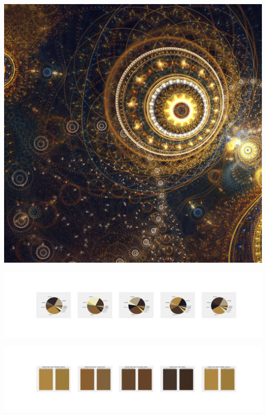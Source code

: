 \documentclass[11pt]{article}
\begin{document}
\begin{landscape}
    \begin{center}
    \includegraphics[width=\textwidth]{./nbimg/file (207).jpg}
    \end{center}

    \begin{center}
    \includegraphics[width=250mm]{./nbimg/pie-120.jpg}
    \end{center}

    \begin{center}
    \includegraphics[width=250mm]{./nbimg/peak-120.jpg}
    \end{center}
    


\end{landscape}
\end{document}

